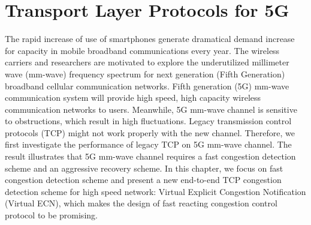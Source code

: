 \chapter{Transport Layer Protocols for 5G}\label{ch:TCP5G} 


\par The rapid increase of use of smartphones generate dramatical demand increase for capacity in mobile broadband communications every year. The wireless carriers and researchers are motivated to explore the underutilized millimeter wave (mm-wave) frequency spectrum for next generation (Fifth Generation) broadband cellular communication networks. Fifth generation (5G) mm-wave communication system will provide high speed, high capacity wireless communication networks to users. Meanwhile, 5G mm-wave channel is sensitive to obstructions, which result in high fluctuations. Legacy transmission control protocols (TCP) might not work properly with the new channel. Therefore, we first investigate the performance of legacy TCP on 5G mm-wave channel. The result illustrates that 5G mm-wave channel requires a fast congestion detection scheme and an aggressive recovery scheme. In this chapter, we focus on fast congestion detection scheme and present a new end-to-end TCP congestion detection scheme for high speed network: Virtual Explicit Congestion Notification (Virtual ECN), which makes the design of fast reacting congestion control protocol to be promising. 
